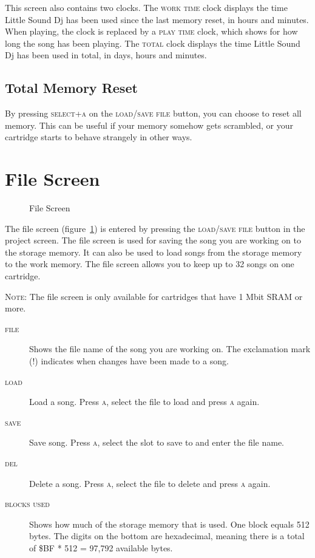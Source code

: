This screen also contains two clocks. The \textsc{work time} clock displays the time Little Sound Dj has been used since the last memory reset, in hours and minutes. When playing, the clock
is replaced by a \textsc{play time} clock, which shows for how long the song has been playing. The \textsc{total} clock displays the time Little Sound Dj has been used in total, in days, hours and minutes.

\subsection{Total Memory Reset}
\label{total-memory-reset}

By pressing \textsc{select+a} on the \textsc{load/save file} button, you can choose to reset all memory. This can be useful if your memory somehow gets scrambled, or your cartridge starts to behave strangely in other ways.

\section{File Screen}

\begin{figure}[htpb]
	\begin{center}
	\end{center}
	\caption{File Screen}
	\label{fig:file}
\end{figure}

The file screen (figure~\ref{fig:file}) is entered by pressing the \textsc{load/save file} button in the project screen. The file screen is used for saving the song you are working on to the storage memory. It can also be used to load songs from the storage memory to the work memory. The file screen allows you to keep up to 32 songs on one cartridge.

\textsc{Note}: The file screen is only available for cartridges that have 1 Mbit SRAM or more.

\begin{description}
	\item[\textsc{file}] Shows the file name of the song you are working on. The exclamation mark (\textsc{!}) indicates when changes have been made to a song.
	\item[\textsc{load}] Load a song. Press \textsc{a}, select the file to load and press \textsc{a} again.
	\item[\textsc{save}] Save song. Press \textsc{a}, select the slot to save to and enter the file name.
	\item[\textsc{del}] Delete a song. Press \textsc{a}, select the file to delete and press \textsc{a} again.
	\item[\textsc{blocks used}] Shows how much of the storage memory that is used. One block equals 512 bytes. The digits on the bottom are hexadecimal, meaning there is a total of \$BF * 512 = 97,792 available bytes.
\end{description}

